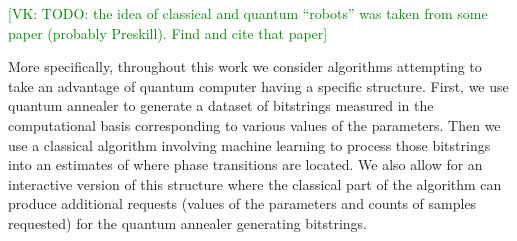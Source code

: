 \documentclass[american,aps,pra,reprint,floatfix,nofootinbib,superscriptaddress]{revtex4-2}
\newcommand{\VK}[1]{\textcolor{green}{[VK: #1]}}
\begin{document}
\VK{TODO: the idea of classical and quantum ``robots'' was taken from some
paper (probably Preskill). Find and cite that paper}

More specifically, throughout this work we consider algorithms attempting
to take an advantage of quantum computer having a specific structure. First,
we use quantum annealer to generate a dataset of bitstrings measured
in the computational basis corresponding
to various values of the parameters. Then we use a classical algorithm
involving machine learning
to process those bitstrings into an estimates of where phase transitions
are located. We also allow for an interactive version of this structure
where the classical part of the algorithm can produce additional requests
(values of the parameters and counts of samples requested) for the quantum
annealer generating bitstrings.
\begin{center}
  \pgfmathparse{\columnwidth/13cm}%
  \edef\tikzscale{\pgfmathresult}%
\end{center}
\end{document}
